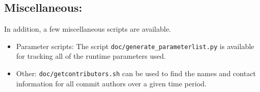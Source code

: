 \subsection{Miscellaneous:} \label{ssec:miscScripts}
In addition, a few miscellaneous scripts are available.
\begin{itemize}
	\item Parameter scripts: The script \texttt{doc/generate_parameterlist.py} is available for tracking all of the runtime parameters used.
	\item Other: \texttt{doc/getcontributors.sh} can be used to find the names and contact information for all commit authors over a given time period. 
\end{itemize}
